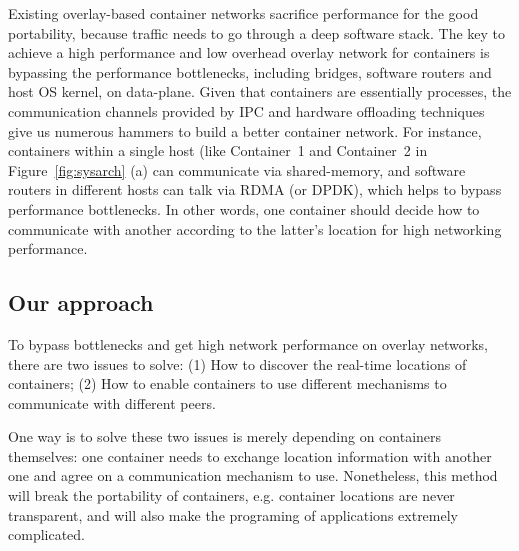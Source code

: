 Existing overlay-based container networks sacrifice performance for 
the good portability, because traffic needs to go through a deep software 
stack. 
The key to achieve a high performance and low overhead overlay network for
containers is bypassing the performance bottlenecks, including bridges, software
routers and host OS kernel, on data-plane. Given that containers are essentially
processes, the communication channels provided by IPC and hardware offloading
techniques give us numerous hammers to build a better container network. For
instance, containers within a single host (like Container~1 and Container~2 in
Figure~\ref{fig:sysarch} (a) 
can communicate via shared-memory, and software routers
in different hosts can talk via RDMA (or DPDK), which helps to bypass performance
bottlenecks. In other words, one container should decide how to communicate
with another according to the latter's location for high networking performance. 


\subsection{Our approach}


To bypass bottlenecks and get high network performance on overlay
networks, there are two issues to solve: (1) How to discover the real-time locations of containers; (2) How to enable containers
to use different mechanisms to communicate with different peers.

One way is to solve these two issues is merely depending on containers themselves:
one container needs to exchange location information with another one and
agree on a communication mechanism to use. Nonetheless, this method will 
break the portability of containers, e.g. container locations are never transparent, and will also make the programing of applications extremely 
complicated. 

